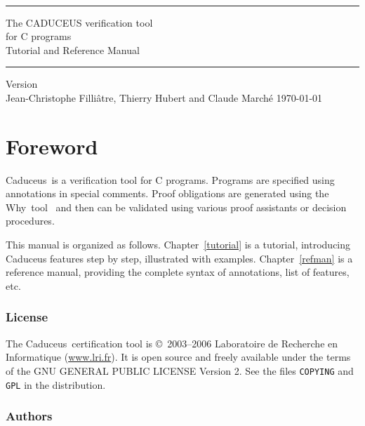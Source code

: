 \documentclass[12pt,a4paper,twoside,openright]{report}
\newcommand{\why}{\textsf{Why}}
\newcommand{\caduceus}{\textsf{Caduceus}}
\begin{document}
\sloppy

\thispagestyle{empty}
\begin{center}
~\\[3cm]
\rule\textwidth{0.1cm}\\[0.5cm]
{\Huge\sf The CADUCEUS verification tool \\[0.5em] for C programs}\\[1cm]
{\Large\sf Tutorial and Reference Manual}\\[0.1cm]
\rule\textwidth{0.1cm}\\[1cm]
Version \caduceusversion\\[3cm]
Jean-Christophe Filli\^atre, Thierry Hubert and Claude March\'e
\vfill
\today\\
\end{center}


\chapter*{Foreword}

\caduceus\ is a verification tool for C programs. Programs are
specified using annotations in special comments. Proof obligations are
generated using the \why\ tool~\cite{Why} and then can be validated using
various proof assistants or decision procedures.

\medskip

This manual is organized as follows. Chapter~\ref{tutorial} is a
tutorial, introducing \caduceus{} features step by step, illustrated
with examples. Chapter~\ref{refman} is a reference manual, providing
the complete syntax of annotations, list of features, etc.

\subsection*{License}

The \caduceus\ certification tool is \copyright\ 2003--2006 Laboratoire de
Recherche en Informatique (\url{www.lri.fr}).
It is open source and freely available under the terms of the GNU
GENERAL PUBLIC LICENSE Version 2. See the files \texttt{COPYING} and
\texttt{GPL} in the distribution.

\subsection*{Authors}
\end{document}
